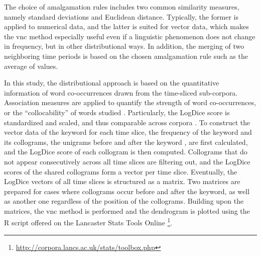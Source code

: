 The choice of amalgamation rules includes two common similarity measures, namely standard deviations and Euclidean distance. Typically, the former is applied to numerical data, and the latter is suited for vector data, which makes the \gls{vnc} method especially useful even if a linguistic phenomenon does not change in frequency, but in other distributional ways. In addition, the merging of two neighboring time periods is based on the chosen amalgamation rule such as the average of values.

In this study, the distributional approach is based on the quantitative information of word co-occurrences drawn from the time-sliced sub-corpora. Association measures are applied to quantify the strength of word co-occurrences, or the ``collocability'' of words studied \parencite{gablasova2017collocations}. Particularly, the LogDice score is standardized and scaled, and thus comparable across corpora \parencite{rychly2008lexicographer,gablasova2017collocations}. To construct the vector data of the keyword \jia for each time slice, the frequency of the keyword and its collograms, the unigrams before and after the keyword \parencite{gablasova2017collocations}, are first calculated, and the LogDice score of each collogram is then computed. Collograms that do not appear consecutively across all time slices are filtering out, and the LogDice scores of the shared collograms form a vector per time slice. Eventually, the LogDice vectors of all time slices is structured as a matrix. Two matrices are prepared for cases where collograms occur before and after the keyword, as well as another one regardless of the position of the collograms. Building upon the matrices, the \gls{vnc} method is performed and the dendrogram is plotted using the R script offered on the Lancaster Stats Tools Online \parencite{brezina2018statistics} \footnote{\url{http://corpora.lancs.ac.uk/stats/toolbox.php}}.

